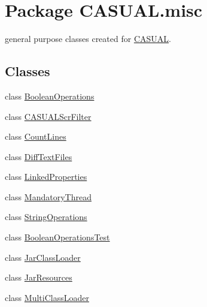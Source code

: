 \hypertarget{namespaceCASUAL_1_1misc}{\section{Package C\-A\-S\-U\-A\-L.\-misc}
\label{namespaceCASUAL_1_1misc}
}


general purpose classes created for \hyperlink{namespaceCASUAL}{C\-A\-S\-U\-A\-L}.  


\subsection*{Classes}
\begin{DoxyCompactItemize}
\item 
class \hyperlink{classCASUAL_1_1misc_1_1BooleanOperations}{Boolean\-Operations}
\item 
class \hyperlink{classCASUAL_1_1misc_1_1CASUALScrFilter}{C\-A\-S\-U\-A\-L\-Scr\-Filter}
\item 
class \hyperlink{classCASUAL_1_1misc_1_1CountLines}{Count\-Lines}
\item 
class \hyperlink{classCASUAL_1_1misc_1_1DiffTextFiles}{Diff\-Text\-Files}
\item 
class \hyperlink{classCASUAL_1_1misc_1_1LinkedProperties}{Linked\-Properties}
\item 
class \hyperlink{classCASUAL_1_1misc_1_1MandatoryThread}{Mandatory\-Thread}
\item 
class \hyperlink{classCASUAL_1_1misc_1_1StringOperations}{String\-Operations}
\item 
class \hyperlink{classCASUAL_1_1misc_1_1BooleanOperationsTest}{Boolean\-Operations\-Test}
\item 
class \hyperlink{classCASUAL_1_1misc_1_1JarClassLoader}{Jar\-Class\-Loader}
\item 
class \hyperlink{classCASUAL_1_1misc_1_1JarResources}{Jar\-Resources}
\item 
class \hyperlink{classCASUAL_1_1misc_1_1MultiClassLoader}{Multi\-Class\-Loader}
\end{DoxyCompactItemize}



